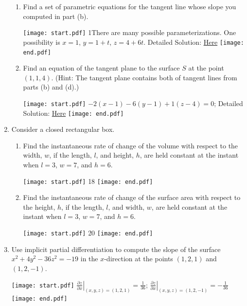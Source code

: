 \documentclass[12pt]{article}
\begin{document}
\begin{enumerate}
\begin{enumerate}
\item Find a set of parametric equations for the tangent line whose slope you computed in part (b).  

\texttt{[image: start.pdf]}
{{{1\linewidth}{There are many possible parameterizations.  One possibility is $x=1$, $y=1+t$, $z=4+6t$. Detailed Solution: \textcolor{blue}{\href{http://www.math.drexel.edu/classes/Calculus/resources/Math200HW/Solutions/10_200_Partial_14.pdf}{Here}} }}}
\texttt{[image: end.pdf]}


\item Find an equation of the tangent plane to the surface $S$ at the point $(1,1,4)$. (Hint: The tangent plane contains both of tangent lines from parts (b) and (d).)

\texttt{[image: start.pdf]}
{{$-2(x-1)-6(y-1)+1(z-4)=0$; Detailed Solution: \textcolor{blue}{\href{http://www.math.drexel.edu/classes/Calculus/resources/Math200HW/Solutions/10_200_Partial_14.pdf}{Here}} }}
\texttt{[image: end.pdf]}


\end{enumerate}

\item Consider a closed rectangular box.

\begin{enumerate}

\item Find the instantaneous rate of change of the volume with respect to the width, $w$, if the length, $l$, and  height, $h$, are held constant at the instant when $l=3$, $w=7$, and $h=6$.

\texttt{[image: start.pdf]}
{{18}}
\texttt{[image: end.pdf]}


\item Find the instantaneous rate of change of the surface area with respect to the height, $h$, if the length, $l$, and  width, $w$, are held constant at the instant when $l=3$, $w=7$, and $h=6$.

\texttt{[image: start.pdf]}
{{20}}
\texttt{[image: end.pdf]}


\end{enumerate}

\item Use implicit partial differentiation to compute the slope of the surface $x^2+4y^2-36z^2=-19$ in the $x$-direction at the points $(1,2,1)$ and $(1,2,-1)$.

\texttt{[image: start.pdf]}
{{$\left.\frac{\partial z}{\partial x}\right|_{(x,y,z)=(1,2,1)}=\frac{1}{36}$; $\left.\frac{\partial z}{\partial x}\right|_{(x,y,z)=(1,2,-1)}=-\frac{1}{36}$}}
\texttt{[image: end.pdf]}



\end{enumerate}
\end{document}
